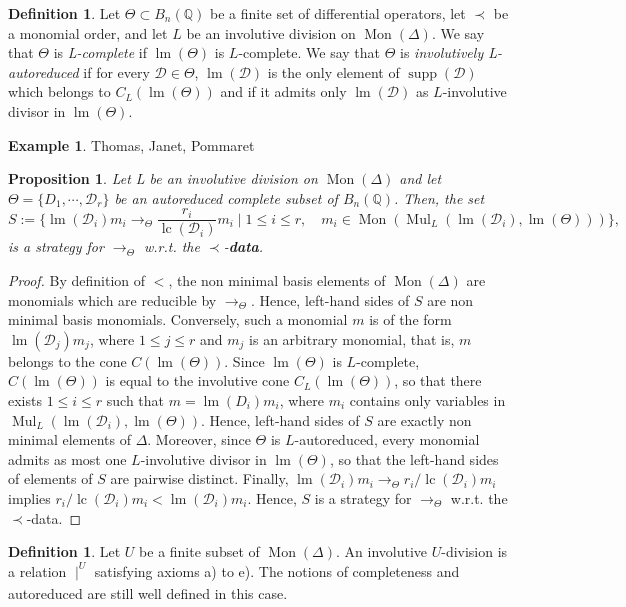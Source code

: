 \documentclass[10pt]{easychair}
\newtheorem{proposition}[theorem]{Proposition}
\theoremstyle{definition}
\newtheorem{definition}[theorem]{Definition}
\newtheorem{example}[theorem]{Example}
\newcommand\data{{\color{red}\bf data}}
\DeclareMathOperator{\supp}{supp}
\newcommand\D{\mathcal{D}}
\DeclareMathOperator{\lm}{lm}
\DeclareMathOperator{\lc}{lc}
\newcommand\Q{\mathbb{Q}}
\newcommand\Weyl[1]{B_{#1}(\Q)}
\DeclareMathOperator{\Mon}{Mon}
\DeclareMathOperator{\Mul}{Mul}
\newcommand\rewTheta{\to_{\Theta}}
\newcommand\divInv[1]{\mid_{#1}}
\begin{document}
\begin{definition}
  Let $\Theta\subset\Weyl{n}$ be a finite set of differential operators,
  let $\prec$ be a monomial order, and let $L$ be an involutive division
  on $\Mon(\Delta)$. We say that $\Theta$ is {\em L-complete} if
  $\lm(\Theta)$ is $L$-complete. We say that $\Theta$ is
  {\em involutively L-autoreduced} if for every $\D\in\Theta$, $\lm(\D)$
  is the only element of $\supp(\D)$ which belongs to $C_L(\lm(\Theta))$
  and if it admits only $\lm(\D)$ as $L$-involutive divisor in
  $\lm(\Theta)$.
\end{definition}

\begin{example}
  Thomas, Janet, Pommaret
\end{example}

\begin{proposition}
  Let L be an involutive division on $\Mon(\Delta)$ and let
  $\Theta=\{D_1,\cdots,\D_r\}$ be an autoreduced complete subset of
  $\Weyl{n}$. Then, the set 
  \[S:=\{\lm(\D_i)m_i\rewTheta\frac{r_i}{\lc(\D_i)}m_i\mid1\leq i\leq r,
  \quad m_i\in\Mon(\Mul_L(\lm(\D_i),\lm(\Theta)))\},\]
  is a strategy for $\rewTheta$ w.r.t. the $\prec$-\data.
\end{proposition}

\begin{proof}
  By definition of $<$, the non minimal basis elements of $\Mon(\Delta)$
  are monomials which are reducible by $\rewTheta$. Hence, left-hand
  sides of $S$ are non minimal basis monomials. Conversely, such a
  monomial $m$ is of the form $\lm(\D_j)m_j$, where $1\leq j\leq r$ and
  $m_j$ is an arbitrary monomial, that is, $m$ belongs to the cone
  $C(\lm(\Theta))$. Since $\lm(\Theta)$ is $L$-complete, $C(\lm(\Theta))$
  is equal to the involutive cone $C_L(\lm(\Theta))$, so that there
  exists $1\leq i\leq r$ such that $m=\lm(D_i)m_i$, where $m_i$ contains
  only variables in $\Mul_L(\lm(\D_i),\lm(\Theta))$. Hence, left-hand
  sides of $S$ are exactly non minimal elements of $\Delta$. Moreover,
  since $\Theta$ is $L$-autoreduced, every monomial admits as most one
  $L$-involutive divisor in $\lm(\Theta)$, so that the left-hand sides
  of elements of $S$ are pairwise distinct. Finally,
  $\lm(\D_i)m_i\rewTheta r_i/\lc(\D_i)m_i$ implies
  $r_i/\lc(\D_i)m_i<\lm(\D_i)m_i$. Hence, $S$ is a strategy for
  $\rewTheta$ w.r.t. the $\prec$-data.
\end{proof}

\begin{definition}
  Let $U$ be a finite subset of $\Mon(\Delta)$. An involutive $U$-division is a relation $\divInv{}^U$ satisfying axioms a) to e). The notions of completeness and autoreduced are still well defined in this case.
\end{definition}
\end{document}
